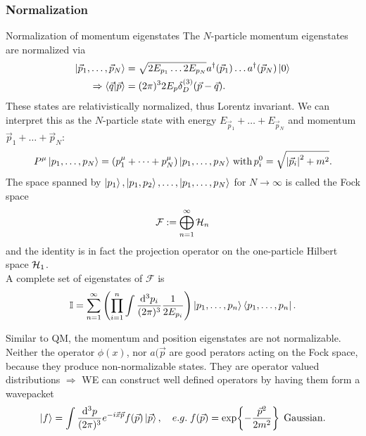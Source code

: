 \subsubsection{Normalization}
\begin{mybox}{Normalization of momentum eigenstates}
The $N$-particle momentum eigenstates are normalized via 
\begin{align}
	\label{eq:fockstates}
	\ket{\vec{p}_1,\dots,\vec{p}_N} &= \sqrt{2 E_{p_1} \dots 2 E_{p_N}} a^{\dagger}(\vec{p}_1) \dots a^{\dagger}(\vec{p}_N) \ket{0}\\
	\Rightarrow \braket{\vec{q}}{\vec{p}} &= (2 \pi)^3 2 E_p \delta^{(3)}_D (\vec{p}-\vec{q}).
\end{align}
These states are relativistically normalized, thus Lorentz invariant. We can interpret this as the $N$-particle state with energy $E_{\vec{p}_1}+\dots +E_{\vec{p}_N}$ and momentum $\vec{p}_1+\dots+\vec{p}_N$:
\begin{equation}
	P^\mu \ket{p_1,\dots,p_N} = (p^\mu_1+\dots+p^\mu_N) \ket{p_1,\dots,p_N} \mathrm{\,with\,} p^0_i=\sqrt{\abs{\vec{p}_i}^2+m^2}.
\end{equation}
The space spanned by $\ket{p_1},\ket{p_1,p_2},\dots,\ket{p_1,\dots,p_N}$ for $N\rightarrow\infty$ is called the Fock space
\begin{equation}
	\mathcal{F} := \bigoplus_{n=1}^\infty \mathcal{H}_n
\end{equation}
and the identity is in fact the projection operator on the one-particle Hilbert space $\mathcal{H}_1$.\\
A complete set of eigenstates of $\mathcal{F}$ is
\begin{equation}
	\mathbb{I} = \sum_{n=1}^{\infty} \left(\prod_{i=1}^{n} \int \frac{\mathrm{d}^3 p_i}{(2 \pi)^3} \frac{1}{2 E_{p_i}} \right) \ket{p_1,\dots,p_n} \bra{p_1,\dots,p_n}.
\end{equation}
\end{mybox}
Similar to QM, the momentum and position eigenstates are not normalizable. Neither the operator $\phi(x)$, nor $a(\vec{p}$ are good perators acting on the Fock space, because they produce non-normalizable states. They are operator valued distributions $\Rightarrow$ WE can construct well defined operators by having them form a wavepacket 
\begin{equation}
\ket{f}=\int \frac{\mathrm{d}^3 p}{(2 \pi)^3} e^{-i \vec{x} \vec{p}} f(\vec{p}) \ket{\vec{p}}, \quad e.g. \; f(\vec{p})=\exp{- \frac{\vec{p}^2}{2m^2}} \;\, \mathrm{Gaussian}.
\end{equation}

